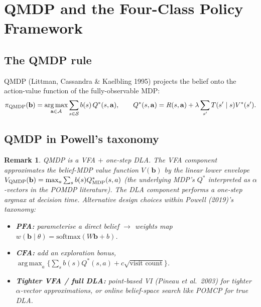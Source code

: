 \documentclass[11pt]{article}
\theoremstyle{plain1}
\theoremstyle{definition1}
\newtheorem*{remark}{Remark}
\newcommand{\argmax}{\operatorname*{arg\,max}}
\newcommand{\1}{\mathbf{1}}
\newcommand{\bel}{\mathbf{b}}
\newcommand{\state}{\mathcal{S}}
\newcommand{\action}{\mathcal{A}}
\begin{document}
\section{QMDP and the Four-Class Policy Framework}\label{sec:qmdp-method}

\subsection{The QMDP rule}

QMDP (Littman, Cassandra \& Kaelbling 1995) projects the belief onto the action-value function of the fully-observable MDP:
\begin{equation}\label{eq:qmdp}
\pi_{\rm QMDP}(\bel) = \argmax_{\mathbf{a} \in \action} \sum_{s \in \state} b(s)\, Q^\ast(s, \mathbf{a}),
\qquad
Q^\ast(s, \mathbf{a}) = R(s, \mathbf{a}) + \lambda \sum_{s'} T(s' \mid s) V^\ast(s').
\end{equation}

\subsection{QMDP in Powell's taxonomy}\label{sec:qmdp-powell}

\begin{remark}\label{rem:qmdp-vfa}
QMDP is a VFA $+$ one-step DLA. The VFA component approximates the belief-MDP value function $V(\bel)$ by the linear lower envelope $V_{\rm QMDP}(\bel) = \max_a \sum_s b(s) Q^\ast_{\rm MDP}(s,a)$ (the underlying MDP's $Q^\ast$ interpreted as $\alpha$-vectors in the POMDP literature). The DLA component performs a one-step argmax at decision time. Alternative design choices within Powell (2019)'s taxonomy:
\begin{itemize}[leftmargin=1.5em,itemsep=2pt]
  \item \textbf{PFA:} parameterise a direct belief $\to$ weights map $w(\bel \mid \theta) = \mathrm{softmax}(W \bel + b)$.
  \item \textbf{CFA:} add an exploration bonus, $\argmax_a \{\sum_s b(s) Q^\ast(s,a) + c \sqrt{\text{visit count}}\}$.
  \item \textbf{Tighter VFA / full DLA:} point-based VI (Pineau et al.\ 2003) for tighter $\alpha$-vector approximations, or online belief-space search like POMCP for true DLA.
\end{itemize}
\end{remark}
\end{document}
